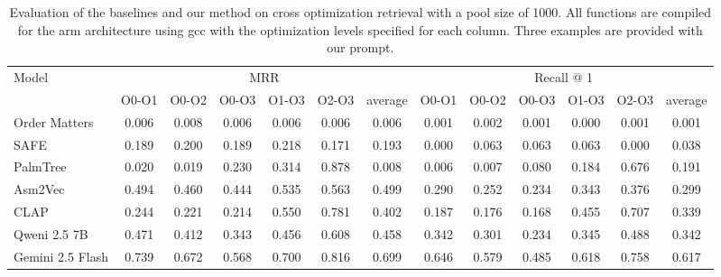 \documentclass[conference,compsoc]{IEEEtran}
\begin{document}
{
    \renewcommand{\arraystretch}{1.3}

    \begin{table*}[!t]
    \centering
    \begin{tabular}{l|cccccc|cccccc}
    \hline
    \multirow{2}{*}{Model} & \multicolumn{6}{c|}{MRR}                        & \multicolumn{6}{c}{Recall @ 1}                  \\ \cline{2-13}
                           & O0-O1 & O0-O2 & O0-O3 & O1-O3 & O2-O3 & average & O0-O1 & O0-O2 & O0-O3 & O1-O3 & O2-O3 & average \\ \hline
    Order Matters          & 0.006 & 0.008 & 0.006 & 0.006 & 0.006 & 0.006   & 0.001 & 0.002 & 0.001 & 0.000 & 0.001 & 0.001   \\
    SAFE                   & 0.189 & 0.200 & 0.189 & 0.218 & 0.171 & 0.193   & 0.000 & 0.063 & 0.063 & 0.063 & 0.000 & 0.038   \\
    PalmTree               & 0.020 & 0.019 & 0.230 & 0.314 & 0.878 & 0.008   & 0.006 & 0.007 & 0.080 & 0.184 & 0.676 & 0.191   \\
    Asm2Vec                & 0.494 & 0.460 & 0.444 & 0.535 & 0.563 & 0.499   & 0.290 & 0.252 & 0.234 & 0.343 & 0.376 & 0.299   \\
    CLAP                   & 0.244 & 0.221 & 0.214 & 0.550 & 0.781 & 0.402   & 0.187 & 0.176 & 0.168 & 0.455 & 0.707 & 0.339   \\ \hline
    Qweni 2.5 7B           & 0.471 & 0.412 & 0.343 & 0.456 & 0.608 & 0.458   & 0.342 & 0.301 & 0.234 & 0.345 & 0.488 & 0.342   \\
    Gemini 2.5 Flash       & 0.739 & 0.672 & 0.568 & 0.700 & 0.816 & 0.699   & 0.646 & 0.579 & 0.485 & 0.618 & 0.758 & 0.617   \\ \hline
    \end{tabular}
    \caption{Evaluation of the baselines and our method on cross optimization retrieval with a pool size of 1000.
    All functions are compiled for the arm architecture using gcc with the optimization levels specified for each column.
    Three examples are provided with our prompt.}
    \label{x-opt}
    \end{table*}
}
\end{document}
